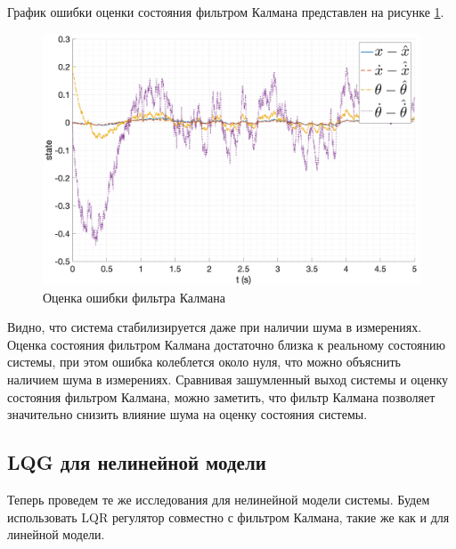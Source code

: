 График ошибки оценки состояния фильтром Калмана представлен на рисунке \ref{fig:lqg_filter_err}. 
\begin{figure}[ht!]
    \centering
    \includegraphics[width=\textwidth]{media/plots/LQG/observer_err_1.png}
    \caption{Оценка ошибки фильтра Калмана}
    \label{fig:lqg_filter_err}
\end{figure}
Видно, что система стабилизируется даже при наличии шума в измерениях. Оценка состояния фильтром Калмана достаточно близка к реальному состоянию системы, 
при этом ошибка колеблется около нуля, что можно объяснить наличием шума в измерениях. Сравнивая зашумленный 
выход системы и оценку состояния фильтром Калмана, можно заметить, что фильтр Калмана позволяет значительно
снизить влияние шума на оценку состояния системы. 

\FloatBarrier
\subsection{LQG для нелинейной модели}
Теперь проведем те же исследования для нелинейной модели системы. Будем использовать LQR регулятор совместно с фильтром Калмана, такие же 
как и для линейной модели. 

